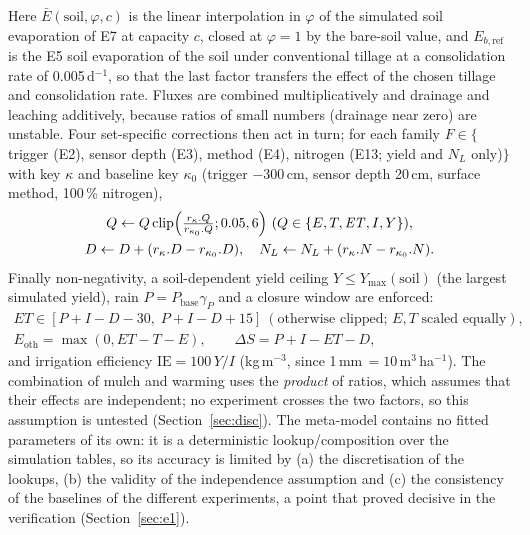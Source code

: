 Here $\bar E(\mathrm{soil},\varphi,c)$ is the linear interpolation in $\varphi$ of the simulated soil evaporation of E7 at capacity $c$, closed at $\varphi=1$ by the bare-soil value, and $E_{b,\mathrm{ref}}$ is the E5 soil evaporation of the soil under conventional tillage at a consolidation rate of 0.005\,d$^{-1}$, so that the last factor transfers the effect of the chosen tillage and consolidation rate. Fluxes are combined multiplicatively and drainage and leaching additively, because ratios of small numbers (drainage near zero) are unstable. Four set-specific corrections then act in turn; for each family $F\in\{$trigger (E2), sensor depth (E3), method (E4), nitrogen (E13; yield and $N_L$ only)$\}$ with key $\kappa$ and baseline key $\kappa_0$ (trigger $-300$\,cm, sensor depth 20\,cm, surface method, 100\,\% nitrogen),
\begin{equation}
\begin{gathered}Q\leftarrow Q\,\mathrm{clip}\Bigl(\tfrac{r_\kappa.Q}{r_{\kappa_0}.Q};0.05,6\Bigr)\ (Q\in\{E,T,\mathit{ET},I,Y\}),\\ D\leftarrow D+(r_\kappa.D-r_{\kappa_0}.D),\quad N_L\leftarrow N_L+(r_\kappa.N-r_{\kappa_0}.N).\end{gathered}
\label{eq:corr}
\end{equation}
Finally non-negativity, a soil-dependent yield ceiling $Y\le Y_{\max}(\mathrm{soil})$ (the largest simulated yield), rain $P=P_{\mathrm{base}}\gamma_P$ and a closure window are enforced:
\begin{equation}
\begin{gathered}\mathit{ET}\in[P+I-D-30,\;P+I-D+15]\ (\text{otherwise clipped; }E,T\text{ scaled equally}),\\ E_{\mathrm{oth}}=\max(0,\mathit{ET}-T-E),\qquad \Delta S=P+I-\mathit{ET}-D,\end{gathered}
\label{eq:E1close}
\end{equation}
and irrigation efficiency $\mathrm{IE}=100\,Y/I$ (kg\,m$^{-3}$, since 1\,mm\,$=10$\,m$^3$\,ha$^{-1}$). The combination of mulch and warming uses the \emph{product} of ratios, which assumes that their effects are independent; no experiment crosses the two factors, so this assumption is untested (Section~\ref{sec:disc}). The meta-model contains no fitted parameters of its own: it is a deterministic lookup/composition over the simulation tables, so its accuracy is limited by (a) the discretisation of the lookups, (b) the validity of the independence assumption and (c) the consistency of the baselines of the different experiments, a point that proved decisive in the verification (Section~\ref{sec:e1}).

